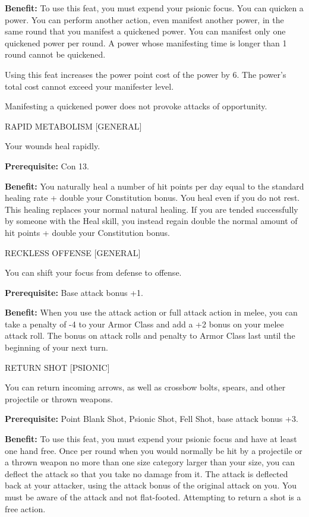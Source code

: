 \documentclass{article}
\begin{document}
\textbf{Benefit:} To use this feat, you must expend your psionic focus. You can 
quicken a power. You can perform another action, even manifest another power, in 
the same round that you manifest a quickened power. You can manifest only one quickened 
power per round. A power whose manifesting time is longer than 1 round cannot be 
quickened.

Using this feat increases the power point cost of the power by 6. The power's total 
cost cannot exceed your manifester level.

Manifesting a quickened power does not provoke attacks of opportunity.

\vspace{12pt}
RAPID METABOLISM [GENERAL]

Your wounds heal rapidly.

\textbf{Prerequisite:} Con 13.

\textbf{Benefit:} You naturally heal a number of hit points per day equal to the 
standard healing rate + double your Constitution  bonus. You heal even if you do 
not rest. This healing replaces your normal natural healing. If you are tended 
successfully by someone with the Heal skill, you instead regain double the normal 
amount of hit points + double your Constitution bonus.

\vspace{12pt}
RECKLESS OFFENSE [GENERAL]

You can shift your focus from defense to offense.

\textbf{Prerequisite:} Base attack bonus +1.

\textbf{Benefit:} When you use the attack action or full attack action in melee, 
you can take a penalty of -4 to your Armor Class and add a +2 bonus on your melee 
attack roll. The bonus on attack rolls and penalty to Armor Class last until the 
beginning of your next turn.

\vspace{12pt}
RETURN SHOT [PSIONIC]

You can return incoming arrows, as well as crossbow bolts, spears, and other projectile 
or thrown weapons.

\textbf{Prerequisite:} Point Blank Shot, Psionic Shot, Fell Shot, base attack bonus 
+3.

\textbf{Benefit:} To use this feat, you must expend your psionic focus and have 
at least one hand free. Once per round when you would normally be hit by a projectile 
or a thrown weapon no more than one size category larger than your size, you can 
deflect the attack so that you take no damage from it. The attack is deflected 
back at your attacker, using the attack bonus of the original attack on you. You 
must be aware of the attack and not flat-footed. Attempting to return a shot is 
a free action.
\end{document}
